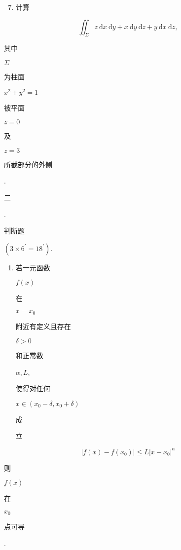 \documentclass[10pt]{article}
\begin{document}
\begin{enumerate}
  \setcounter{enumi}{6}
  \item \begin{CJK}{UTF8}{mj}计算\end{CJK}
\end{enumerate}
$$
\iint_{\Sigma} z \mathrm{~d} x \mathrm{~d} y+x \mathrm{~d} y \mathrm{~d} z+y \mathrm{~d} x \mathrm{~d} z,
$$
\begin{CJK}{UTF8}{mj}其中\end{CJK} $\Sigma$ \begin{CJK}{UTF8}{mj}为柱面\end{CJK} $x^{2}+y^{2}=1$ \begin{CJK}{UTF8}{mj}被平面\end{CJK} $z=0$ \begin{CJK}{UTF8}{mj}及\end{CJK} $z=3$ \begin{CJK}{UTF8}{mj}所截部分的外侧\end{CJK}.

\begin{CJK}{UTF8}{mj}二\end{CJK}. \begin{CJK}{UTF8}{mj}判断题\end{CJK} $\left(3 \times 6^{\prime}=18^{\prime}\right)$.

\begin{enumerate}
  \item \begin{CJK}{UTF8}{mj}若一元函数\end{CJK} $f(x)$ \begin{CJK}{UTF8}{mj}在\end{CJK} $x=x_{0}$ \begin{CJK}{UTF8}{mj}附近有定义且存在\end{CJK} $\delta>0$ \begin{CJK}{UTF8}{mj}和正常数\end{CJK} $\alpha, L$, \begin{CJK}{UTF8}{mj}使得对任何\end{CJK} $x \in\left(x_{0}-\delta, x_{0}+\delta\right)$ \begin{CJK}{UTF8}{mj}成\end{CJK} \begin{CJK}{UTF8}{mj}立\end{CJK}
\end{enumerate}
$$
\left|f(x)-f\left(x_{0}\right)\right| \leqslant L\left|x-x_{0}\right|^{\alpha}
$$
\begin{CJK}{UTF8}{mj}则\end{CJK} $f(x)$ \begin{CJK}{UTF8}{mj}在\end{CJK} $x_{0}$ \begin{CJK}{UTF8}{mj}点可导\end{CJK}.
\end{document}
